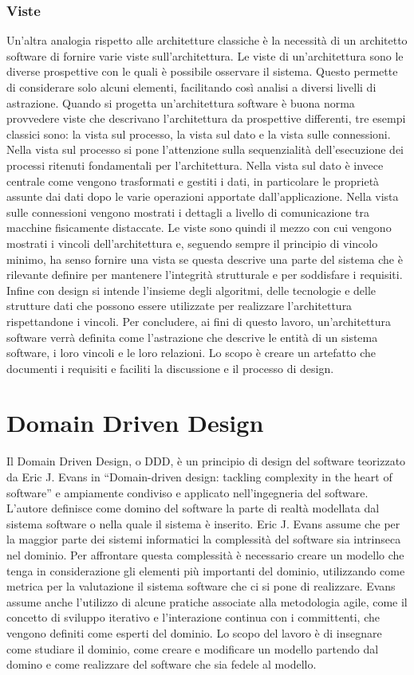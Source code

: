 \documentclass[12pt]{report}
\begin{document}
\subsubsection{Viste}
Un'altra analogia rispetto alle architetture classiche è la necessità di un architetto software di fornire varie viste sull'architettura.
Le viste di un'architettura sono le diverse prospettive con le quali è possibile osservare il sistema. 
Questo permette di considerare solo alcuni elementi, facilitando così analisi a diversi livelli di astrazione.
Quando si progetta un'architettura software è buona norma provvedere viste che descrivano l'architettura da prospettive differenti, tre esempi classici sono: la vista sul processo, la vista sul dato e la vista sulle connessioni.
Nella vista sul processo si pone l'attenzione sulla sequenzialità dell'esecuzione dei processi ritenuti fondamentali per l'architettura.
Nella vista sul dato è invece centrale come vengono trasformati e gestiti i dati, in particolare le proprietà assunte dai dati dopo le varie operazioni apportate dall'applicazione.
Nella vista sulle connessioni vengono mostrati i dettagli a livello di comunicazione tra macchine fisicamente distaccate. 
Le viste sono quindi il mezzo con cui vengono mostrati i vincoli dell'architettura e, seguendo sempre il principio di vincolo minimo, ha senso fornire una vista se questa descrive una parte del sistema che è rilevante definire per mantenere l'integrità strutturale e per soddisfare i requisiti. 
Infine con design si intende l'insieme degli algoritmi, delle tecnologie e delle strutture dati che possono essere utilizzate per realizzare l'architettura rispettandone i vincoli. 
Per concludere, ai fini di questo lavoro, un'architettura software verrà definita come l'astrazione che descrive le entità di un sistema software, i loro vincoli e le loro relazioni.
Lo scopo è creare un artefatto che documenti i requisiti e faciliti la discussione e il processo di design.

\section{Domain Driven Design}\label{DDD}
Il Domain Driven Design, o DDD, è un principio di design del software teorizzato da Eric J. Evans in ``Domain-driven design: tackling complexity in the heart of software'' \cite{evans_domain-driven_2004} e ampiamente condiviso e applicato nell'ingegneria del software. 
L'autore definisce come domino del software la parte di realtà modellata dal sistema software o nella quale il sistema è inserito.
Eric J. Evans assume che per la maggior parte dei sistemi informatici la complessità del software sia intrinseca nel dominio.
Per affrontare questa complessità è necessario creare un modello che tenga in considerazione gli elementi più importanti del dominio, utilizzando come metrica per la valutazione il sistema software che ci si pone di realizzare. 
Evans assume anche l'utilizzo di alcune pratiche associate alla metodologia agile, come il concetto di sviluppo iterativo e l'interazione continua con i committenti, che vengono definiti come esperti del dominio.
Lo scopo del lavoro è di insegnare come studiare il dominio, come creare e modificare un modello partendo dal domino e come realizzare del software che sia fedele al modello.
\end{document}

